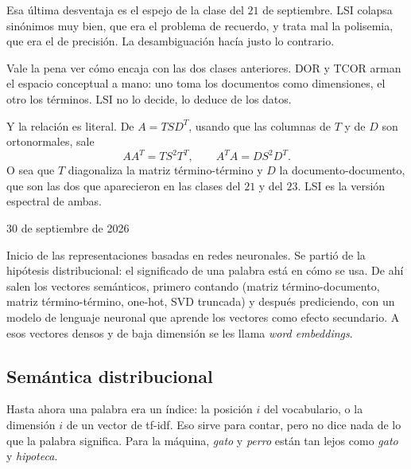 \documentclass[11pt,letterpaper]{article}
\begin{document}
\begin{idea}
    Esa última desventaja es el espejo de la clase del $21$ de
    septiembre. LSI colapsa sinónimos muy bien, que era el problema de
    recuerdo, y trata mal la polisemia, que era el de precisión. La
    desambiguación hacía justo lo contrario.
\end{idea}

\begin{idea}
    Vale la pena ver cómo encaja con las dos clases anteriores. DOR y
    TCOR arman el espacio conceptual a mano: uno toma los documentos
    como dimensiones, el otro los términos. LSI no lo decide, lo
    deduce de los datos.

    Y la relación es literal. De $A = T S D^{T}$, usando que las
    columnas de $T$ y de $D$ son ortonormales, sale
    \[
        A A^{T} = T S^2 T^{T} ,
        \qquad
        A^{T} A = D S^2 D^{T} .
    \]
    O sea que $T$ diagonaliza la matriz término-término y $D$ la
    documento-documento, que son las dos que aparecieron en las clases
    del $21$ y del $23$. LSI es la versión espectral de ambas.
\end{idea}


\newpage

%
      {30 de septiembre de 2026}

\begin{quick_sum}
    Inicio de las representaciones basadas en redes neuronales. Se
    partió de la hipótesis distribucional: el significado de una
    palabra está en cómo se usa. De ahí salen los vectores semánticos,
    primero contando (matriz término-documento, matriz término-término,
    one-hot, SVD truncada) y después prediciendo, con un modelo de
    lenguaje neuronal que aprende los vectores como efecto secundario.
    A esos vectores densos y de baja dimensión se les llama
    \textit{word embeddings}.
\end{quick_sum}

\subsection*{Semántica distribucional}

Hasta ahora una palabra era un índice: la posición $i$ del
vocabulario, o la dimensión $i$ de un vector de tf-idf. Eso sirve para
contar, pero no dice nada de lo que la palabra significa. Para la
máquina, \textit{gato} y \textit{perro} están tan lejos como
\textit{gato} y \textit{hipoteca}.
\end{document}
